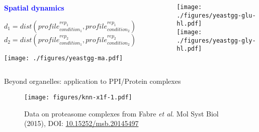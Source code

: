 \begin{frame}
  \begin{columns}[t]
    \begin{column}[T]{0.5\textwidth}            
      \textcolor{Blue}{\textbf{Spatial dynamics}}
      \bigskip
      \begin{scriptsize}
        \center
        $d_1 = dist(profile_{condition_1}^{rep_1}, profile_{condition_2}^{rep_1})$
        $d_2= dist(profile_{condition_1}^{rep_2}, profile_{condition_2}^{rep_2})$         
      \end{scriptsize}
      \texttt{[image: ./figures/yeastgg-ma.pdf]}          
    \end{column}
    \begin{column}[T]{0.5\textwidth}            
      \texttt{[image: ./figures/yeastgg-glu-hl.pdf]}\\
      \texttt{[image: ./figures/yeastgg-gly-hl.pdf]} 
    \end{column}
  \end{columns}
\end{frame}



\begin{frame}{Beyond organelles: application to PPI/Protein complexes}

  \begin{figure}[t]
    \texttt{[image: figures/knn-x1f-1.pdf]}
    \caption{Data on proteasome complexes from Fabre \textit{et
        al.}  Mol Syst Biol (2015), DOI:
      \url{10.15252/msb.20145497}}
  \end{figure}

\end{frame}


